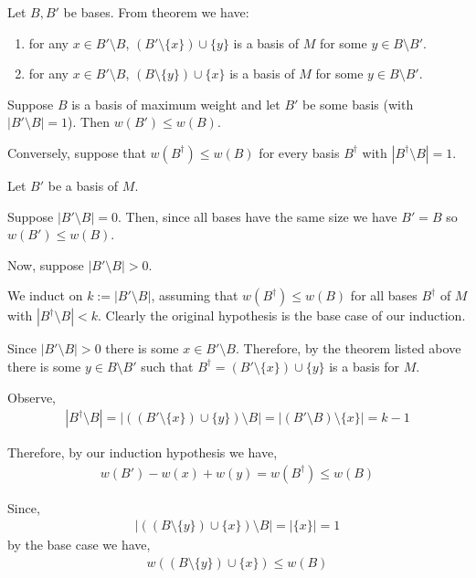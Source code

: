 \documentclass[10pt]{article}
\begin{document}
\begin{solution}

Let \( B,B' \) be bases. From theorem we have:
\begin{enumerate}[label=(\roman*),nolistsep]
    \item for any \( x\in B'\setminus B \), \( (B'\setminus\{x\})\cup \{y\} \) is a basis of \( M \) for some  \( y\in B\setminus B' \).
    \item for any \( x\in B'\setminus B \), \( (B\setminus\{y\})\cup \{x\} \) is a basis of \( M \) for some  \( y\in B\setminus B' \).
\end{enumerate}


\vspace{1em}
Suppose \( B \) is a basis of maximum weight and let \( B' \) be some basis (with \( |B'\setminus B| = 1 \)). Then \( w(B') \leq w(B) \). 

Conversely, suppose that \( w(B^\dagger) \leq w(B) \) for every basis \( B^\dagger \) with \( |B^\dagger \setminus B| = 1 \). 

Let \( B' \) be a basis of \( M \).

Suppose \( | B' \setminus B| = 0 \). Then, since all bases have the same size we have \( B' = B \) so \( w(B') \leq w(B) \).

Now, suppose \( |B' \setminus B| > 0 \).

We induct on \( k := |B' \setminus B| \), assuming that \( w(B^\dagger) \leq w(B) \) for all bases \( B^\dagger \) of \( M \) with \( |B^\dagger \setminus B| < k \). Clearly the original hypothesis is the base case of our induction.

Since \( |B'\setminus B| > 0 \) there is some \( x\in B'\setminus B \). Therefore, by the theorem listed above there is some \( y\in B\setminus B' \) such that \( B^\dagger = (B' \setminus \{x\}) \cup \{y\} \) is a basis for \( M \).

Observe,
\begin{align*}
    |B^\dagger\setminus B| = | ((B'\setminus \{ x \})\cup\{y\}) \setminus B| = | (B'\setminus B)\setminus\{x\} | = k - 1 
\end{align*}

Therefore, by our induction hypothesis we have,
\begin{align*}
    w(B') - w(x) + w(y) = w(B^\dagger) \leq w(B)
\end{align*}


Since,
\begin{align*}
    |((B\setminus \{y\})\cup\{x\}) \setminus B| = |\{x\}| = 1 
\end{align*}
by the base case we have,
\begin{align*}
    w((B\setminus\{y\})\cup\{x\}) \leq w(B)
\end{align*}


\end{solution}
\end{document}
